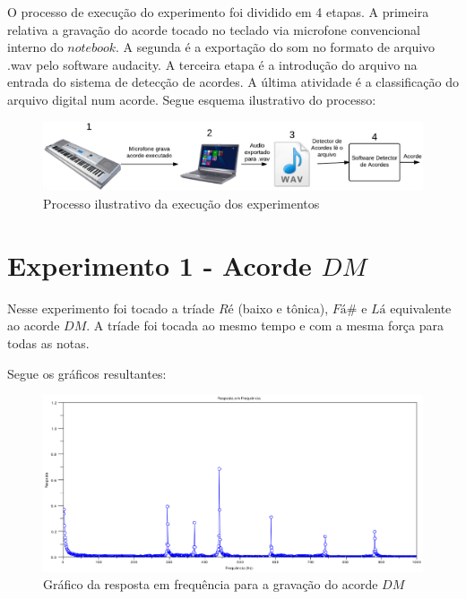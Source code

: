 O processo de execução do experimento foi dividido em 4 etapas. A primeira relativa a gravação do acorde tocado no teclado via microfone convencional interno do $notebook$. A segunda é a exportação do som no formato de arquivo .wav pelo software audacity. A terceira etapa é a introdução do arquivo na entrada do sistema de detecção de acordes. A última atividade é a classificação do arquivo digital num acorde. Segue esquema ilustrativo do processo:

\begin{figure}[h]
	\centering
		\includegraphics[keepaspectratio=true,scale=0.35]{figuras/processo_experimento.eps}
	\caption{Processo ilustrativo da execução dos experimentos}
\end{figure}

\newpage
\section{Experimento 1 - Acorde $DM$}
\label{sec:experimento1}

Nesse experimento foi tocado a tríade $Ré$ (baixo e tônica), $Fá\#$ e $Lá$ equivalente ao acorde $DM$. A tríade foi tocada ao mesmo tempo e com a mesma força para todas as notas.

Segue os gráficos resultantes:

\begin{figure}[h]
	\centering
		\includegraphics[keepaspectratio=true,scale=0.49]{figuras/Dm/fft_DM.eps}
	\caption{Gráfico da resposta em frequência para a gravação do acorde $DM$}
\end{figure}

